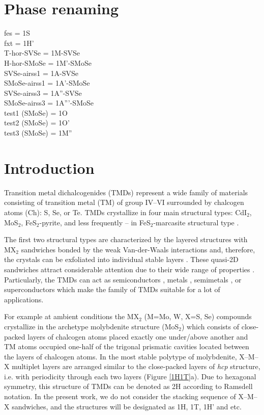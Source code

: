 \documentclass[a4paperm]{article}
\begin{document}
\section*{Phase renaming}
fes = 1S \\
fxt = 1H' \\
T-hor-SVSe = 1M-SVSe \\
H-hor-SMoSe = 1M'-SMoSe \\
SVSe-airss1 = 1A-SVSe \\
SMoSe-airss1 = 1A'-SMoSe \\
SVSe-airss3 = 1A''-SVSe \\
SMoSe-airss3 = 1A'''-SMoSe \\
test1 (SMoSe) = 1O \\
test2 (SMoSe) = 1O' \\
test3 (SMoSe) = 1M'' \\


\section{Introduction}

Transition metal dichalcogenides (TMDs) represent a wide family of materials consisting of transition metal (TM) of group IV--VI surrounded by chalcogen atoms (Ch): S, Se, or Te. 
TMDs crystallize in four main structural types: CdI$_2$, MoS$_2$, FeS$_2$-pyrite, and less frequently -- in FeS$_2$-marcasite structural type \cite{wells}.

The first two structural types are characterized by the layered structures with MX$_2$ sandwiches bonded by the weak Van-der-Waals interactions and, therefore, the crystals can be exfoliated into individual stable layers \cite{zhang2020intercalation}. These quasi-2D sandwiches attract considerable attention due to their wide range of properties \cite{li2017graphene, SHI20181, xi2016ising, hu2019recent, pi2019recent}. 
Particularly, the TMDs can act as semiconductors \cite{nayeri2018transport}, metals \cite{zhao20212d}, semimetals \cite{xu2020high, zhao2020observation}, or superconductors \cite{wang2020nodeless,hsu2017topological} which make the family of TMDs suitable for a lot of applications. 

For example at ambient conditions the MX$_2$ (M=Mo, W, X=S, Se) compounds crystallize in the archetype molybdenite structure (MoS$_2$) which consists of close-packed layers of chalcogen atoms placed exactly one under/above another and TM atoms occupied one-half of the trigonal prismatic cavities located between the layers of chalcogen atoms. 
In the most stable polytype of molybdenite, X--M--X multiplet layers are arranged similar to the close-packed layers of {\it hcp} structure, i.e. with periodicity through each two layers (Figure \ref{1H1T}a).
Due to hexagonal symmetry, this structure of TMDs can be denoted as 2H according to Ramsdell notation.
In the present work, we do not consider the stacking sequence of X--M--X sandwiches, and the structures will be designated as 1H, 1T, 1H' and etc.
\end{document}
